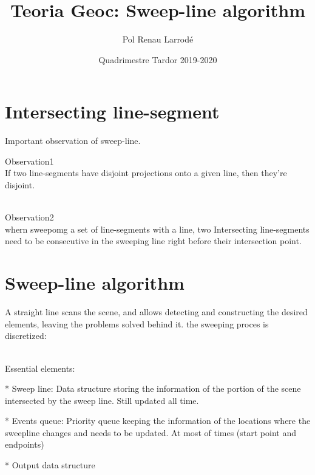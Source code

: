 \documentclass{article}
\title { Teoria Geoc: Sweep-line algorithm}
\date { Quadrimestre Tardor 2019-2020}
\author {Pol Renau Larrod\'e}
\begin{document}
  \maketitle
  \newpage

  \section {Intersecting line-segment}

  Important observation of sweep-line.


  Observation1
  \\
  If two line-segments have disjoint projections onto a given line, then they're disjoint.

  \\

  Observation2
  \\
  whern sweepomg a set of line-segments with a line, two Intersecting line-segments need to be consecutive in the sweeping line right before their intersection point.

  \section{Sweep-line algorithm}

  A straight line scans the scene, and allows detecting and constructing the desired elements, leaving the problems solved behind it. the sweeping proces is discretized:

  \\
  Essential elements:

  * Sweep line:
    Data structure storing the information of the portion of the scene intersected by the sweep line. Still updated all time.

  * Events queue:
    Priority queue keeping the information of the locations where the sweepline changes and needs to be updated. At most of times (start point and endpoints)

  * Output data structure
\end{document}
